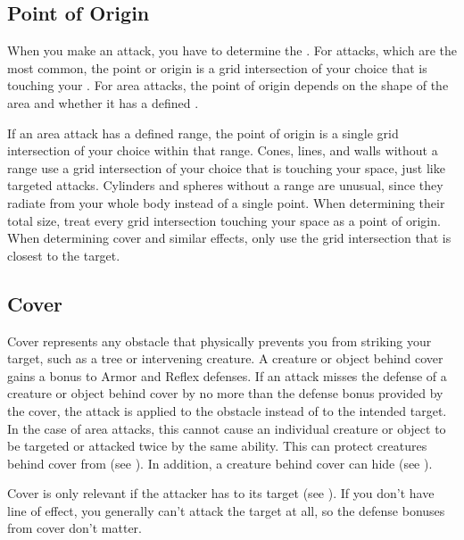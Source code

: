     \subsection{Point of Origin}\label{Point of Origin}
        When you make an attack, you have to determine the .
        For  attacks, which are the most common, the point or origin is a grid intersection of your choice that is touching your .
        For area attacks, the point of origin depends on the shape of the area and whether it has a defined .

        If an area attack has a defined range, the point of origin is a single grid intersection of your choice within that range.
        Cones, lines, and walls without a range use a grid intersection of your choice that is touching your space, just like targeted attacks.
        Cylinders and spheres without a range are unusual, since they radiate from your whole body instead of a single point.
        When determining their total size, treat every grid intersection touching your space as a point of origin.
        When determining cover and similar effects, only use the grid intersection that is closest to the target.

    \subsection{Cover}\label{Cover}

        Cover represents any obstacle that physically prevents you from striking your target, such as a tree or intervening creature.
        A creature or object behind cover gains a  bonus to Armor and Reflex defenses.
        If an attack misses the defense of a creature or object behind cover by no more than the defense bonus provided by the cover,
            the attack is applied to the obstacle instead of to the intended target.
        In the case of area attacks, this cannot cause an individual creature or object to be targeted or attacked twice by the same ability.
        This can protect creatures behind cover from  (see ).
        In addition, a creature behind cover can hide (see ).

        Cover is only relevant if the attacker has  to its target (see ).
        If you don't have line of effect, you generally can't attack the target at all, so the defense bonuses from cover don't matter.

